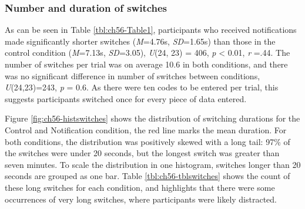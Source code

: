 \subsubsection{Number and duration of switches}
As can be seen in Table \ref{tbl:ch56-Table1}, participants who received notifications made significantly shorter switches (\textit{M}=4.76s, \textit{SD}=1.65s) than those in the control condition (\textit{M}=7.13s, \textit{SD}=3.05), \textit{U}(24, 23) = 406, \textit{p} < 0.01, \textit{r} =.44. The number of switches per trial was on average 10.6 in both conditions, and there was no significant difference in number of switches between conditions, \textit{U}(24,23)=243, \textit{p} = 0.6. As there were ten codes to be entered per trial, this suggests participants switched once for every piece of data entered. 

Figure \ref{fig:ch56-histswitches} shows the distribution of switching durations for the Control and Notification condition, the red line marks the mean duration. For both conditions, the distribution was positively skewed with a long tail: 97\% of the switches were under 20 seconds, but the longest switch was greater than seven minutes. To scale the distribution in one histogram, switches longer than 20 seconds are grouped as one bar. Table \ref{tbl:ch56-tblswitches} shows the count of these long switches for each condition, and highlights that there were some occurrences of very long switches, where participants were likely distracted. 

